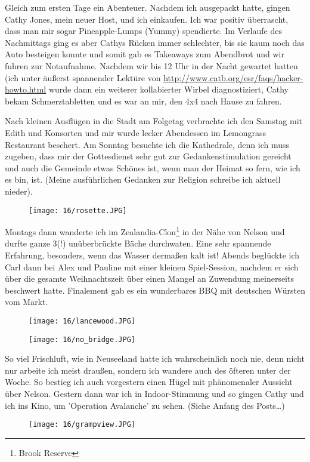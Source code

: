 Gleich zum ersten Tage ein Abenteuer. Nachdem ich ausgepackt hatte,
gingen Cathy Jones, mein neuer Host, und ich einkaufen. Ich war positiv
überrascht, dass man mir sogar Pineapple-Lumps (Yummy) spendierte. Im
Verlaufe des Nachmittags ging es aber Cathys Rücken immer schlechter,
bis sie kaum noch das Auto besteigen konnte und somit gab es Takeaways
zum Abendbrot und wir fuhren zur Notaufnahme. Nachdem wir bis 12 Uhr in
der Nacht gewartet hatten (ich unter äußerst spannender Lektüre von
\url{http://www.catb.org/esr/faqs/hacker-howto.html}
wurde dann ein weiterer kollabierter Wirbel diagnostiziert, Cathy bekam
Schmerztabletten und es war an mir, den 4x4 nach Hause zu fahren.

Nach kleinen Ausflügen in die Stadt am Folgetag verbrachte ich den
Samstag mit Edith und Konsorten und mir wurde lecker Abendessen im
Lemongrass Restaurant beschert. Am Sonntag besuchte ich die Kathedrale,
denn ich muss zugeben, dass mir der Gottesdienst sehr gut zur
Gedankenstimulation gereicht und auch die Gemeinde etwas Schönes ist,
wenn man der Heimat so fern, wie ich es bin, ist. (Meine ausführlichen
Gedanken zur Religion schreibe ich aktuell nieder).
\begin{figure}[h]
  \centering
  \texttt{[image: 16/rosette.JPG]}
\end{figure}

Montags dann wanderte ich im Zealandia-Clon\footnote{Brook Reserve} in
der Nähe von Nelson und durfte ganze 3(!) unüberbrückte Bäche
durchwaten. Eine sehr spannende Erfahrung, besonders, wenn das Wasser
dermaßen kalt ist! Abends beglückte ich Carl dann bei Alex und Pauline
mit einer kleinen Spiel-Session, nachdem er sich über die gesamte
Weihnachtszeit über einen Mangel an Zuwendung meinerseits beschwert
hatte. Finalement gab es ein wunderbares BBQ mit deutschen Würsten vom
Markt.
\begin{figure}[h]
  \centering
  \texttt{[image: 16/lancewood.JPG]}
\end{figure}
\begin{figure}[h]
  \centering
  \texttt{[image: 16/no\_bridge.JPG]}
\end{figure}

So viel Frischluft, wie in Neuseeland hatte ich wahrscheinlich noch nie,
denn nicht nur arbeite ich meist draußen, sondern ich wandere auch des
öfteren unter der Woche. So bestieg ich auch vorgestern einen Hügel mit
phänomenaler Aussicht über Nelson. Gestern dann war ich in
Indoor-Stimmung und so gingen Cathy und ich ins Kino, um 'Operation
Avalanche' zu sehen. (Siehe Anfang des Posts\ldots)
\begin{figure}[h]
  \centering
  \texttt{[image: 16/grampview.JPG]}
\end{figure}

